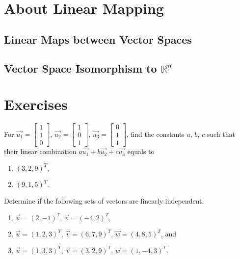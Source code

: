 \section{About Linear Mapping}

\subsection{Linear Maps between Vector Spaces}

\subsection{Vector Space Isomorphism to $\mathbb{R}^n$}

\section{Exercises}

\begin{Exercise}
For $\vec{u_1} =
\begin{bmatrix}
1\\
1\\
0
\end{bmatrix}$,
$\vec{u_2} =
\begin{bmatrix}
1\\
0\\
1
\end{bmatrix}$,
$\vec{u_3} =
\begin{bmatrix}
0\\
1\\
1
\end{bmatrix}$,
find the constants $a$, $b$, $c$ such that their linear combination $a\vec{u_1} + b\vec{u_2} + c\vec{u_3}$ equals to 
\begin{enumerate}[label=(\alph*)]
\item $(3,2,9)^T$, 
\item $(9,1,5)^T$.
\end{enumerate}
\end{Exercise}

\begin{Exercise}
Determine if the following sets of vectors are linearly independent.
\begin{enumerate}[label=(\alph*)]
\item $\vec{u} = (2,-1)^T$, $\vec{v} = (-4,2)^T$,
\item $\vec{u} = (1,2,3)^T$, $\vec{v} = (6,7,9)^T$, $\vec{w} = (4,8,5)^T$, and
\item $\vec{u} = (1,3,3)^T$, $\vec{v}=(3,2,9)^T$, $\vec{w} = (1,-4,3)^T$.
\end{enumerate}
\end{Exercise}

